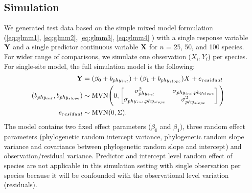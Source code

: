 \documentclass[12pt]{article}
\begin{document}
\subsection{Simulation}

We generated test data based on the simple mixed model formulation (\ref{eq:glmm1}, \ref{eq:glmm2}, \ref{eq:glmm3}, \ref{eq:glmm4} ) with a single response variable ${\mathbf Y}$ and a single predictor continuous variable ${\mathbf X}$ for $n$ = 25, 50, and 100 species.
For wider range of comparisons, we simulate one observation ($X_i,Y_i$) per species.
For single-site model, the full simulation model is the following:
\begin{align}
{\mathbf Y} & = (\beta_0 + b_{phy_{int}}) + (\beta_1 + b_{phy_{slope}}) X + e_{residual}  \label{eq:ss_sim}\\\
(b_{phy_{int}}, b_{phy_{slope}}) & \sim \textrm{MVN} \Bigg( 0, \begin{bmatrix}
\sigma^2_{phy_{int}} & \sigma_{phy_{int},phy_{slope}} \\ 
\sigma_{phy_{int},phy_{slope}} & \sigma^2_{phy_{slope}}
\end{bmatrix} 
\Bigg) \\ 
e_{residual} & \sim \textrm{MVN} ( 0 , \Sigma) .
\end{align}
The model contains two fixed effect parameters ($\beta_0$ and $\beta_1$), three random effect parameters (phylogenetic random intercept variance, phylogenetic random slope variance and covariance between phylogenetic random slope and intercept) and observation/residual variance.  
Predictor and intercept level random effect of species are not applicable in this simulation setting with single observation per species because it will be confounded with the observational level variation (residuals).
\end{document}
